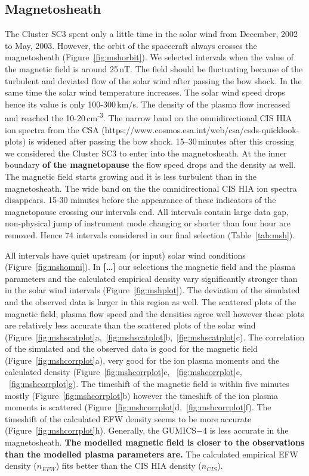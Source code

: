 \documentclass[linenumbers,draft]{agujournal}
\begin{document}
\subsection{Magnetosheath}
\label{sec:msh}

The Cluster SC3 spent only a little time in the solar wind from December, 2002 to May, 2003. However, the orbit of the spacecraft always crosses the magnetosheath (Figure~\ref{fig:mshorbit}). We selected intervals when the value of the magnetic field is around 25\,nT. The field should be fluctuating because of the turbulent and deviated flow of the solar wind after passing the bow shock. In the same time the solar wind temperature increases. The solar wind speed drops hence its value is only 100-300\,km/s. The density of the plasma flow increased and reached the 10-20\,cm\textsuperscript{-3}.  The narrow band on the  omnidirectional CIS HIA ion spectra from the CSA (https://www.cosmos.esa.int/web/csa/csds-quicklook-plots) is widened after passing the bow shock. 15--30\,minutes after this crossing we considered the Cluster SC3 to enter into the magnetosheath. At the inner boundary \textbf{of the magnetopause} the flow speed drops and the density as well. The magnetic field starts growing and it is less turbulent than in the magnetosheath. The wide band on the  the omnidirectional CIS HIA ion spectra disappears. 15-30 minutes before the appearance  of these indicators of the magnetopause crossing our intervals end. All intervals contain large data gap, non-physical jump of instrument mode changing or shorter than four hour are removed. Hence 74 intervals considered in our final selection (Table~\ref{tab:msh}). 

All intervals have quiet upstream (or input) solar wind conditions (Figure~\ref{fig:mshomni}). In \textbf{[\dots]} our selection\textbf{s} the magnetic field and the plasma parameters and the calculated empirical density vary significantly stronger than in the solar wind intervals (Figure~\ref{fig:mshplot}). The deviation of the simulated and the observed data is larger in this region as well. The scattered plots of the magnetic field, plasma flow speed and the densities agree well however these plots are relatively less accurate than the scattered plots of the solar wind (Figure~\ref{fig:mshscatplot}a,~\ref{fig:mshscatplot}b,~\ref{fig:mshscatplot}c). The correlation of the simulated and the observed data is good for the magnetic field (Figure~\ref{fig:mshcorrplot}a), very good for the ion plasma moments and the calculated density (Figure~\ref{fig:mshcorrplot}c, ~\ref{fig:mshcorrplot}e, ~\ref{fig:mshcorrplot}g). The timeshift of the magnetic field is within five minutes mostly (Figure~\ref{fig:mshcorrplot}b) however the timeshift of the ion plasma moments is scattered (Figure~\ref{fig:mshcorrplot}d,~\ref{fig:mshcorrplot}f). The timeshift of the calculated EFW density seems to be more accurate (Figure~\ref{fig:mshcorrplot}h). Generally, the GUMICS$-$4 is less accurate in the magnetosheath. \textbf{The modelled magnetic field is closer to the observations than the modelled plasma parameters are.} The calculated empirical EFW density ($n_{EFW}$) fits better than the CIS HIA density ($n_{CIS}$).
\end{document}
